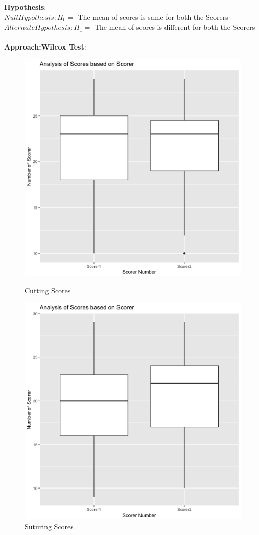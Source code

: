 \documentclass[12pt,epsf]{report}
\begin{document}
\textbf{Hypothesis}:\\
$Null Hypothesis : H_0 = $ The mean of scores is same for both the Scorers\\
$Alternate Hypothesis : H_1 = $ The  mean of scores is different for both the Scorers\\
\\
\textbf{Approach:Wilcox Test}:\\
\begin{figure}[!ht]
	\begin{minipage}[c]{0.5\linewidth}
	\includegraphics[width=\linewidth]{Cutting_Scores}
	\caption{ Cutting Scores}
	\end{minipage}
	\hfill
	\begin{minipage}[c]{0.5\linewidth}
	\includegraphics[width=\linewidth]{Suturing_Scores}
	\caption{Suturing Scores}
	\end{minipage}
\end{figure}
\end{document}
